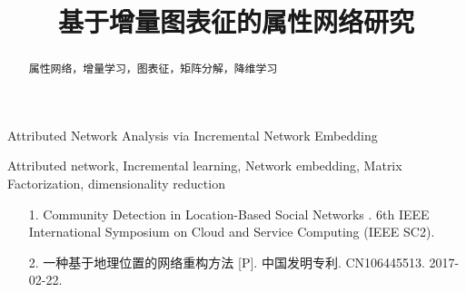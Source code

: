 \documentclass{sysuthesis} %
\numberwithin{algorithm}{chapter}
\theoremstyle{plain}
\theoremstyle{definition}
\theoremstyle{definition}
\begin{document}
\title{基于增量图表征的属性网络研究}{}{Attributed Network Analysis via Incremental Network Embedding}{}

\author{}{}
\advisor{}{}{}{}
\major{}{}
\school{}




\maketitle

\begin{abstract}{属性网络，增量学习，图表征，矩阵分解，降维学习}
  
\end{abstract}

\begin{englishabstract}{Attributed network, Incremental learning, Network embedding, Matrix Factorization, dimensionality reduction}
  
\end{englishabstract}

\tableofcontents


\begin{Main} %










%

%

\end{Main} %






\newpage
\printindex %

\begin{Resume}
\begin{itemize}
\item [1.] Community Detection in Location-Based Social Networks . 6th IEEE International Symposium on Cloud and Service Computing (IEEE SC2). 
\item [2.]  一种基于地理位置的网络重构方法 [P]. 中国发明专利. CN106445513. 2017-02-22.
\end{itemize}
\end{Resume}





\begin{Acknowledgement}


\vspace{6pt}


\end{Acknowledgement}
\end{document}
